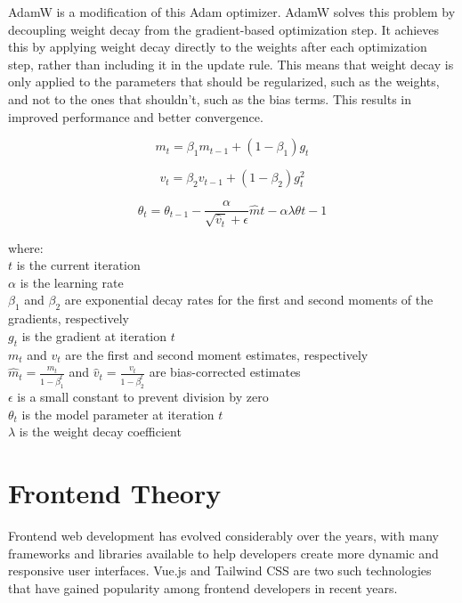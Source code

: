\documentclass[12pt]{report}
\begin{document}
AdamW is a modification of this Adam optimizer. AdamW solves this problem by decoupling weight decay from the gradient-based optimization step. It achieves this by applying weight decay directly to the weights after each optimization step, rather than including it in the update rule. This means that weight decay is only applied to the parameters that should be regularized, such as the weights, and not to the ones that shouldn't, such as the bias terms. This results in improved performance and better convergence.

\begin{equation}
m_t = \beta_1 m_{t-1} + (1 - \beta_1) g_t \end{equation}

\begin{equation}
v_t = \beta_2 v_{t-1} + (1 - \beta_2) g_t^2 
\end{equation}

\begin{equation}
\theta_t = \theta_{t-1} - \frac{\alpha}{\sqrt{\hat{v}_t} + \epsilon} \hat{m}t - \alpha \lambda \theta{t-1}
\end{equation}

where:\\
$t$ is the current iteration \\
$\alpha$ is the learning rate \\
$\beta_1$ and $\beta_2$ are exponential decay rates for the first and second moments of the gradients, respectively \\
$g_t$ is the gradient at iteration $t$ \\
$m_t$ and $v_t$ are the first and second moment estimates, respectively \\
$\hat{m}_t = \frac{m_t}{1 - \beta_1^t}$ and $\hat{v}_t = \frac{v_t}{1 - \beta_2^t}$ are bias-corrected estimates \\
$\epsilon$ is a small constant to prevent division by zero\\
$\theta_t$ is the model parameter at iteration $t$\\
$\lambda$ is the weight decay coefficient\\

\section{Frontend Theory}
Frontend web development has evolved considerably over the years, with many frameworks and libraries available to help developers create more dynamic and responsive user interfaces. Vue.js and Tailwind CSS are two such technologies that have gained popularity among frontend developers in recent years.
\end{document}
